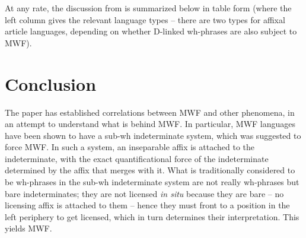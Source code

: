 \documentclass[output=paper,colorlinks,citecolor=brown]{langscibook}
\begin{document}
At any rate, the discussion from  is summarized below in table form (where the left column %
gives the relevant language types -- there are two types for affixal article languages, depending on whether D-linked wh-phrases are also subject to MWF).


\begin{table}
    \caption{Summary}
\label{bosk:tab:final}
\end{table}

\section{Conclusion}\label{sec:bosk:3}

The paper has established correlations between MWF and other phenomena, in an attempt to understand what is behind MWF. In particular, MWF languages have been shown to have a sub-wh indeterminate system, which was suggested to force MWF. In such a system, an inseparable affix is attached to the indeterminate, with the exact quantificational force of the indeterminate determined by the affix that merges with it. What is traditionally considered to be wh-phrases in the sub-wh indeterminate system are not really wh-phrases but bare indeterminates; they are not licensed \textit{in situ} because they are bare -- no licensing affix is attached to them -- hence they must front to a position in the left periphery to get licensed, which in turn determines their interpretation. This yields MWF.
\end{document}
